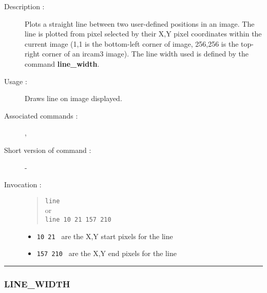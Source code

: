 \begin{description}

\item[Description :] Plots a straight line between two user-defined
positions in an image.  The line is plotted from pixel selected by
their X,Y pixel coordinates within the current image (1,1 is the
bottom-left corner of image, 256,256 is the top-right corner of an {\sc
ircam3} image).  The line width used is defined by the command {\bf
line\_width}.

\item[Usage :] Draws line on image displayed.
\item[Associated commands :] {\tt {}},
{\tt {}}
\item[Short version of command :] -
\item[Invocation :]

\begin{quote}{\tt  line }\\
or \\
{\tt line 10 21 157 210 }
\end{quote}

\begin{itemize}

\item {\tt 10 21 } are the X,Y start pixels for the line
\item {\tt 157 210 } are the X,Y end pixels for the line
\end{itemize}

\end{description}

\hrule
\subsubsection*{\label{LINE_WIDTH}LINE\_WIDTH}

